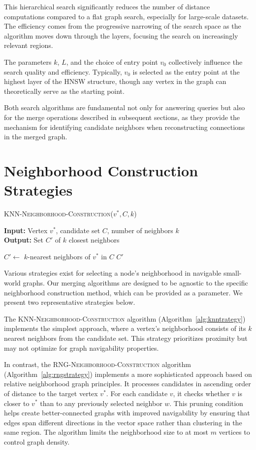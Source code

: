 \documentclass{article}
\begin{document}
This hierarchical search significantly reduces the number of distance computations compared to a flat graph search, especially for large-scale datasets. The efficiency comes from the progressive narrowing of the search space as the algorithm moves down through the layers, focusing the search on increasingly relevant regions.

The parameters $k$, $L$, and the choice of entry point $v_0$ collectively influence the search quality and efficiency. Typically, $v_0$ is selected as the entry point at the highest layer of the HNSW structure, though any vertex in the graph can theoretically serve as the starting point.

Both search algorithms are fundamental not only for answering queries but also for the merge operations described in subsequent sections, as they provide the mechanism for identifying candidate neighbors when reconstructing connections in the merged graph.

\section{Neighborhood Construction Strategies}

\begin{algorithm}
\caption{\textsc{KNN-Neighborhood-Construction}($v^*, C, k$)}\label{alg:knntrategy}
\textbf{Input:} Vertex $v^*$, candidate set $C$, number of neighbors $k$ \\
\textbf{Output:} Set $C'$ of $k$ closest neighbors
\begin{algorithmic}[1]
\State $C' \gets$ $k$-nearest neighbors of $v^*$ in $C$
\State \Return $C'$
\end{algorithmic}
\end{algorithm}

Various strategies exist for selecting a node's neighborhood in navigable small-world graphs. Our merging algorithms are designed to be agnostic to the specific neighborhood construction method, which can be provided as a parameter. We present two representative strategies below.

The \textsc{KNN-Neighborhood-Construction} algorithm (Algorithm~\ref{alg:knntrategy}) implements the simplest approach, where a vertex's neighborhood consists of its $k$ nearest neighbors from the candidate set. This strategy prioritizes proximity but may not optimize for graph navigability properties.

In contrast, the \textsc{RNG-Neighborhood-Construction} algorithm (Algorithm~\ref{alg:rngstrategy}) implements a more sophisticated approach based on relative neighborhood graph principles. It processes candidates in ascending order of distance to the target vertex $v^*$. For each candidate $v$, it checks whether $v$ is closer to $v^*$ than to any previously selected neighbor $w$. This pruning condition helps create better-connected graphs with improved navigability by ensuring that edges span different directions in the vector space rather than clustering in the same region. The algorithm limits the neighborhood size to at most $m$ vertices to control graph density.
\end{document}
